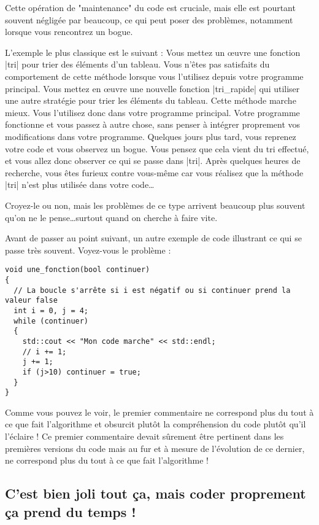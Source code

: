 Cette opération de "maintenance" du code est cruciale, mais elle est pourtant souvent négligée par beaucoup, ce qui
peut poser des problèmes, notamment lorsque vous rencontrez un bogue.

L'exemple le plus classique est le suivant : Vous mettez un {\oe}uvre une fonction |tri| pour trier des éléments d'un tableau.
Vous n'êtes pas satisfaits du comportement de cette méthode lorsque vous l'utilisez depuis votre programme principal. Vous mettez en {\oe}uvre une nouvelle fonction |tri_rapide| qui utiliser une autre stratégie pour trier les éléments du tableau.
Cette méthode marche mieux. Vous l'utilisez donc dans votre programme principal. Votre programme fonctionne et vous passez à autre chose, sans penser à intégrer proprement vos modifications dans votre programme. Quelques jours plus tard, vous reprenez
votre code et vous observez un bogue. Vous pensez que cela vient du tri effectué, et vous allez donc observer ce qui se passe dans |tri|. Après quelques heures de recherche, vous êtes furieux contre vous-même car vous réalisez que la méthode |tri| n'est plus utilisée dans votre code\ldots

Croyez-le ou non, mais les problèmes de ce type arrivent beaucoup plus souvent qu'on ne le pense\ldots surtout quand on cherche à faire vite.

Avant de passer au point suivant, un autre exemple de code illustrant ce qui se passe très souvent. Voyez-vous le problème :

\begin{lstlisting}
void une_fonction(bool continuer)
{
  // La boucle s'arrête si i est négatif ou si continuer prend la valeur false
  int i = 0, j = 4;
  while (continuer)
  {
    std::cout << "Mon code marche" << std::endl;
    // i += 1;
    j += 1;
    if (j>10) continuer = true;
  }
}
\end{lstlisting}

Comme vous pouvez le voir, le premier commentaire ne correspond plus du tout à ce que fait l'algorithme et obsurcit plutôt
la compréhension du code plutôt qu'il l'éclaire ! Ce premier commentaire devait sûrement être pertinent dans les premières
versions du code mais au fur et à mesure de l'évolution de ce dernier, ne correspond plus du tout à ce que fait l'algorithme !

\subsection{C'est bien joli tout ça, mais coder proprement ça prend du temps !}


